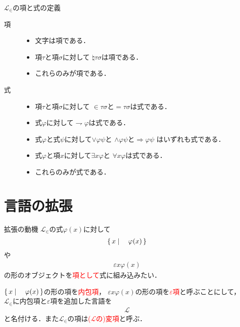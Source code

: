 \newpage
	\begin{itembox}[l]{$\mathcal{L}_{\in}$の項と式の定義}
		\begin{description}
			\item[項] 
				\begin{itemize}
					\item 文字は項である．
					\item 項$\tau$と項$\sigma$に対して
						$\natural \tau \sigma$は項である．
					\item これらのみが項である．
				\end{itemize}
			
			\item[式] 
				\begin{itemize}
					\item 項$\tau$と項$\sigma$に対して
						$\in \tau \sigma$と$= \tau \sigma$は式である．
					\item 式$\varphi$に対して$\rightharpoondown \varphi$は式である．
					\item 式$\varphi$と式$\psi$に対して$\vee \varphi \psi$と
						$\wedge \varphi \psi$と$\Longrightarrow \varphi \psi$
						はいずれも式である．
					\item 式$\varphi$と項$x$に対して$\exists x \varphi$と
						$\forall x \varphi$は式である．
					\item これらのみが式である．
				\end{itemize}
		\end{description}
	\end{itembox}
	
\section{言語の拡張}
	\begin{itembox}[l]{拡張の動機}
		$\mathcal{L}_{\in}$の式$\varphi(x)$に対して
		\begin{align}
			\left\{\, x \mid \quad \varphi(x)\, \right\}
		\end{align}
		や
		\begin{align}
			\varepsilon x \varphi(x)
		\end{align}
		の形のオブジェクトを\textcolor{red}{項として}式に組み込みたい．
	\end{itembox}
	
\newpage
	$\left\{\, x \mid \quad \varphi(x)\, \right\}$の形の項を\textcolor{red}{内包項}，
	$\varepsilon x \varphi(x)$の形の項を\textcolor{red}{$\varepsilon$項}と呼ぶことにして，
	$\mathcal{L}_{\in}$に内包項と$\varepsilon$項を追加した言語を
	\begin{align}
		\mathcal{L}
	\end{align}
	と名付ける．また$\mathcal{L}_{\in}$の項は\textcolor{red}{($\mathcal{L}$の)変項}と呼ぶ．
	
